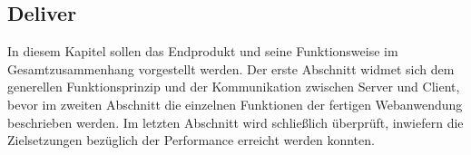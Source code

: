 \begin{newpage}
  \section{Deliver}
  \label{sec:deliver}

    In diesem Kapitel sollen das Endprodukt und seine Funktionsweise im Gesamtzusammenhang vorgestellt werden. Der erste Abschnitt widmet sich dem generellen Funktionsprinzip und der Kommunikation zwischen Server und Client, bevor im zweiten Abschnitt die einzelnen Funktionen der fertigen Webanwendung beschrieben werden. Im letzten Abschnitt wird schließlich überprüft, inwiefern die Zielsetzungen bezüglich der Performance erreicht werden konnten. 
    
    
    
    
    
\end{newpage}